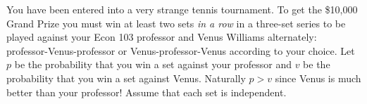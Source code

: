 \documentclass[addpoints,12pt]{exam}\usepackage[]{graphicx}\usepackage[]{xcolor}
\begin{document}
\begin{questions}
	 

\question You have been entered into a very strange tennis tournament. To get the \$10,000 Grand Prize you must win at least two sets \emph{in a row} in a three-set series to be played against your Econ 103 professor and Venus Williams alternately: professor-Venus-professor or Venus-professor-Venus according to your choice. Let $p$ be the probability that you win a set against your professor and $v$ be the probability that you win a set against Venus. Naturally $p>v$ since Venus is much better than your professor! Assume that each set is independent.
\end{questions}
\end{document}
